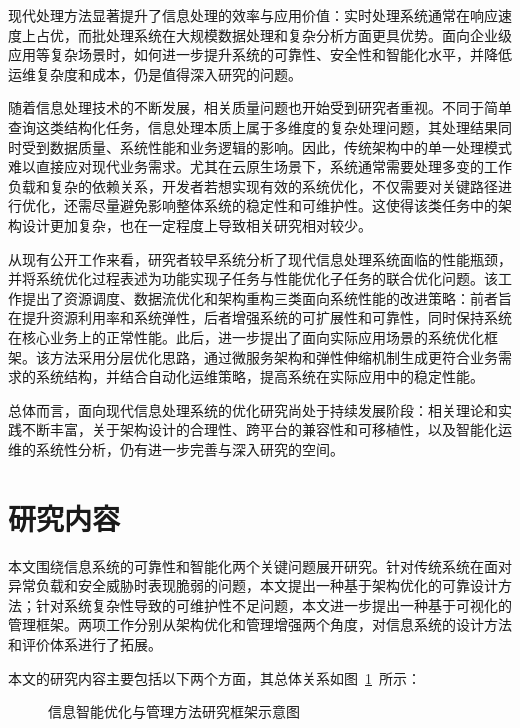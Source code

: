 现代处理方法显著提升了信息处理的效率与应用价值：实时处理系统通常在响应速度上占优，而批处理系统在大规模数据处理和复杂分析方面更具优势。面向企业级应用等复杂场景时，如何进一步提升系统的可靠性、安全性和智能化水平，并降低运维复杂度和成本，仍是值得深入研究的问题。

随着信息处理技术的不断发展，相关质量问题也开始受到研究者重视。不同于简单查询这类结构化任务，信息处理本质上属于多维度的复杂处理问题，其处理结果同时受到数据质量、系统性能和业务逻辑的影响。因此，传统架构中的单一处理模式难以直接应对现代业务需求。尤其在云原生场景下，系统通常需要处理多变的工作负载和复杂的依赖关系，开发者若想实现有效的系统优化，不仅需要对关键路径进行优化，还需尽量避免影响整体系统的稳定性和可维护性。这使得该类任务中的架构设计更加复杂，也在一定程度上导致相关研究相对较少。

从现有公开工作来看，研究者较早系统分析了现代信息处理系统面临的性能瓶颈，并将系统优化过程表述为功能实现子任务与性能优化子任务的联合优化问题。该工作提出了资源调度、数据流优化和架构重构三类面向系统性能的改进策略：前者旨在提升资源利用率和系统弹性，后者增强系统的可扩展性和可靠性，同时保持系统在核心业务上的正常性能。此后，进一步提出了面向实际应用场景的系统优化框架。该方法采用分层优化思路，通过微服务架构和弹性伸缩机制生成更符合业务需求的系统结构，并结合自动化运维策略，提高系统在实际应用中的稳定性能。

总体而言，面向现代信息处理系统的优化研究尚处于持续发展阶段：相关理论和实践不断丰富，关于架构设计的合理性、跨平台的兼容性和可移植性，以及智能化运维的系统性分析，仍有进一步完善与深入研究的空间。

\section{研究内容}\label{ux7814ux7a76ux5185ux5bb9}

本文围绕信息系统的可靠性和智能化两个关键问题展开研究。针对传统系统在面对异常负载和安全威胁时表现脆弱的问题，本文提出一种基于架构优化的可靠设计方法；针对系统复杂性导致的可维护性不足问题，本文进一步提出一种基于可视化的管理框架。两项工作分别从架构优化和管理增强两个角度，对信息系统的设计方法和评价体系进行了拓展。

本文的研究内容主要包括以下两个方面，其总体关系如图~\ref{fig:ch1-research-framework}~所示：

\begin{figure}[htbp]
\centering
{}
\caption{信息智能优化与管理方法研究框架示意图}
\label{fig:ch1-research-framework}
\end{figure}

